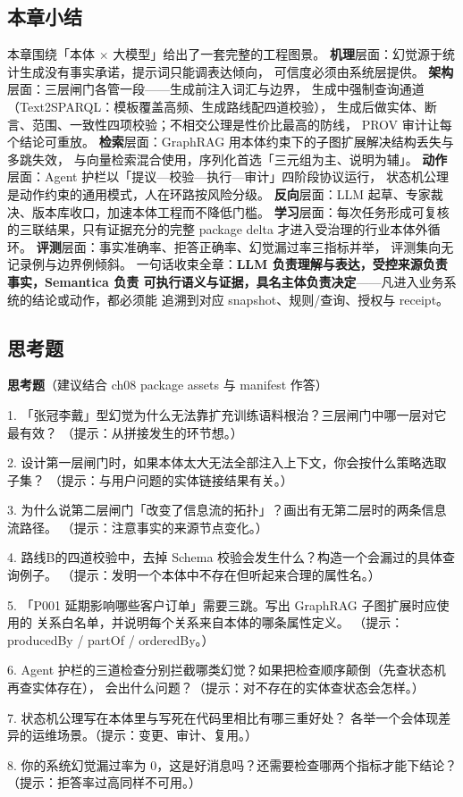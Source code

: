 \subsection{本章小结}

本章围绕「本体 \(\times\) 大模型」给出了一套完整的工程图景。
\textbf{机理}层面：幻觉源于统计生成没有事实承诺，提示词只能调表达倾向，
可信度必须由系统层提供。
\textbf{架构}层面：三层闸门各管一段——生成前注入词汇与边界，
生成中强制查询通道（Text2SPARQL：模板覆盖高频、生成路线配四道校验），
生成后做实体、断言、范围、一致性四项校验；不相交公理是性价比最高的防线，
PROV 审计让每个结论可重放。
\textbf{检索}层面：GraphRAG 用本体约束下的子图扩展解决结构丢失与多跳失效，
与向量检索混合使用，序列化首选「三元组为主、说明为辅」。
\textbf{动作}层面：Agent 护栏以「提议—校验—执行—审计」四阶段协议运行，
状态机公理是动作约束的通用模式，人在环路按风险分级。
\textbf{反向}层面：LLM 起草、专家裁决、版本库收口，加速本体工程而不降低门槛。
\textbf{学习}层面：每次任务形成可复核的三联结果，只有证据充分的完整 package delta
才进入受治理的行业本体外循环。
\textbf{评测}层面：事实准确率、拒答正确率、幻觉漏过率三指标并举，
评测集向无记录例与边界例倾斜。
一句话收束全章：\textbf{LLM 负责理解与表达，受控来源负责事实，Semantica 负责
可执行语义与证据，具名主体负责决定}——凡进入业务系统的结论或动作，都必须能
追溯到对应 snapshot、规则/查询、授权与 receipt。

\subsection{思考题}

\begin{noteblock}
\textbf{思考题}（建议结合 ch08 package assets 与 manifest 作答）

1. 「张冠李戴」型幻觉为什么无法靠扩充训练语料根治？三层闸门中哪一层对它最有效？
（提示：从拼接发生的环节想。）

2. 设计第一层闸门时，如果本体太大无法全部注入上下文，你会按什么策略选取子集？
（提示：与用户问题的实体链接结果有关。）

3. 为什么说第二层闸门「改变了信息流的拓扑」？画出有无第二层时的两条信息流路径。
（提示：注意事实的来源节点变化。）

4. 路线B的四道校验中，去掉 Schema 校验会发生什么？构造一个会漏过的具体查询例子。
（提示：发明一个本体中不存在但听起来合理的属性名。）

5. 「P001 延期影响哪些客户订单」需要三跳。写出 GraphRAG 子图扩展时应使用的
关系白名单，并说明每个关系来自本体的哪条属性定义。
（提示：producedBy / partOf / orderedBy。）

6. Agent 护栏的三道检查分别拦截哪类幻觉？如果把检查顺序颠倒（先查状态机再查实体存在），
会出什么问题？（提示：对不存在的实体查状态会怎样。）

7. 状态机公理写在本体里与写死在代码里相比有哪三重好处？
各举一个会体现差异的运维场景。（提示：变更、审计、复用。）

8. 你的系统幻觉漏过率为 0，这是好消息吗？还需要检查哪两个指标才能下结论？
（提示：拒答率过高同样不可用。）
\end{noteblock}

